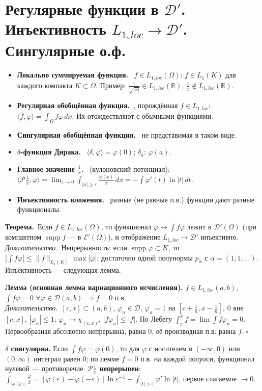 \documentclass[11pt,a4paper]{article}
\newcommand{\RR}{\mathbb R}
\newcommand{\DD}{\mathcal D}
\newcommand{\EE}{\mathcal E}
\newcommand{\supp}{\operatorname{supp}}
\newcommand{\df}[1]{\textbf{#1.}~}
\newcommand{\thm}{\textbf{Теорема.}~}
\newcommand{\pf}{\textit{Доказательство.}~}
\newcommand{\qedd}{\hfill$\square$}
\begin{document}
\section{Регулярные функции в $\DD'$. Инъективность $L_{1,loc}\to\DD'$. Сингулярные о.ф.}
\begin{defs}
\begin{itemize}
\item \df{Локально суммируемая функция} $f\in L_{1,loc}(\Omega)$: $f\in L_1(K)$ для каждого компакта $K\subset\Omega$. Пример: $\frac1{\sqrt{|x|}}\in L_{1,loc}(\RR)$, $\frac1x\notin L_{1,loc}(\RR)$.
\item \df{Регулярная обобщённая функция}, порождённая $f\in L_{1,loc}$: $\langle f,\varphi\rangle=\int_\Omega f\varphi\,dx$. Их отождествляют с обычными функциями.
\item \df{Сингулярная обобщённая функция} не представимая в таком виде.
\item \df{$\delta$-функция Дирака} $\langle\delta,\varphi\rangle=\varphi(0)$; $\delta_a$: $\varphi(a)$.
\item \df{Главное значение $\frac1x$} (кулоновский потенциал): $\langle\mathcal P\tfrac1x,\varphi\rangle=\lim_{\varepsilon\to0}\int_{|x|\ge\varepsilon}\frac{\varphi(x)}x\,dx=-\int\varphi'(t)\ln|t|\,dt$.
\item \df{Инъективность вложения} разные (не равные п.в.) функции дают разные функционалы.
\end{itemize}
\end{defs}

\thm Если $f\in L_{1,loc}(\Omega)$, то функционал $\varphi\mapsto\int f\varphi$ лежит в $\DD'(\Omega)$ (при компактном $\supp f$ — в $\EE'(\Omega)$), и отображение $L_{1,loc}\to\DD'$ инъективно.\\
\pf Непрерывность: если $\supp\varphi\subset K$, то $|\int f\varphi|\le\|f\|_{L_1(K)}\max|\varphi|$; достаточно одной полунормы $p_\alpha$ с $\alpha=(1,1,\dots)$. Инъективность — следующая лемма.

\textbf{Лемма (основная лемма вариационного исчисления).} $f\in L_{1,loc}(a,b)$, $\int f\varphi=0$ $\forall\varphi\in\DD(a,b)$ $\Rightarrow f=0$ п.в.\\
\pf $[c,x]\subset(a,b)$, $\varphi_n\in\DD$, $\varphi_n=1$ на $[c+\frac1n,x-\frac1n]$, $0$ вне $[c,x]$, $|\varphi_n|\le1$; $\varphi_n\to\chi_{(c,x)}$, $|f\varphi_n|\le|f|$. По Лебегу $\int_c^xf=\lim\int f\varphi_n=0$. Первообразная абсолютно непрерывна, равна $0$, её производная п.в. равна $f$. \qedd

\textbf{$\delta$ сингулярна.} Если $\int f\varphi=\varphi(0)$, то для $\varphi$ с носителем в $(-\infty,0)$ или $(0,\infty)$ интеграл равен $0$; по лемме $f=0$ п.в. на каждой полуоси, функционал нулевой — противоречие. \textbf{$\mathcal P\frac1x$ непрерывен}: $\int_{|x|\ge\varepsilon}\frac\varphi x=[\varphi(\varepsilon)-\varphi(-\varepsilon)]\ln\varepsilon^{-1}-\int_{|t|>\varepsilon}\varphi'\ln|t|$, первое слагаемое $\to0$.
\end{document}
